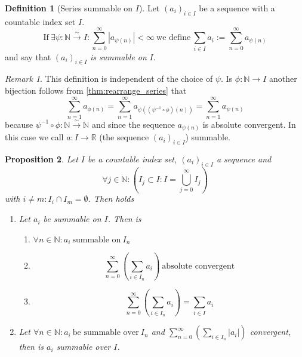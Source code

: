 \documentclass[english,titlepage]{uzhpub}
\theoremstyle{definition}
\newtheorem{definition}{Definition}[section]
\theoremstyle{plain}
\newtheorem{proposition}[definition]{Proposition}
\theoremstyle{remark}
\newtheorem*{remark}{Remark}
\theoremstyle{example}
\begin{document}
   \begin{definition}[Series summable on \(I\)]
      Let \((a_i)_{i \in I}\) be a sequence with a countable index set \(I\).
      \[\text{If}~\exists \psi: \mathbb{N} \xrightarrow{\sim} I: \sum_{n=0}^\infty |a_{\psi(n)}| < \infty~\text{we define}~\sum_{i \in I} a_i := \sum_{n=0}^\infty a_{\psi(n)}\]
      and say that \((a_i)_{i \in I}\) \textit{is summable on} \(I\).
   \end{definition}
   \begin{remark}
      This definition is independent of the choice of \(\psi\).
      Is \(\phi: \mathbb{N} \to I\) another bijection follows from \cref{thm:rearrange_series} that
      \[\sum_{n=1}^\infty a_{\phi(n)} = \sum_{n=1}^\infty a_{\psi((\psi^{-1} \circ \phi)(n))} = \sum_{n=1}^\infty a_{\psi(n)}\]
      because \(\psi^{-1} \circ \phi: \mathbb{N} \xrightarrow{\sim} \mathbb{N}\) and since the sequence \(a_{\psi(n)}\) is absolute convergent.
      In this case we call \(a: I \to \mathbb{R}\) (the sequence \((a_i)_{i \in I}\)) summable.
   \end{remark}

   \begin{proposition}\label{pro:sumable}
      Let \(I\) be a countable index set, \((a_i)_{i \in I}\) a sequence and
      \[\forall j \in \mathbb{N}: \left(I_j \subset I: I = \bigcup_{j=0}^\infty I_j\right)\]
      with \(i \neq m: I_i \cap I_m = \emptyset\).
      Then holds
      \begin{enumerate}[label=\roman*, align=Center]
         \item Let \(a_i\) be summable on \(I\). Then is
            \begin{enumerate}
               \item \(\forall n \in \mathbb{N}: a_i~\text{summable on}~I_n\)
               \item \[\sum_{n=0}^\infty\left(\sum_{i \in I_n} a_i\right)~\text{absolute convergent}\]
               \item \[\sum_{n=0}^\infty\left(\sum_{i \in I_n} a_i\right) = \sum_{i \in I} a_i\]
            \end{enumerate}
         \item Let \(\forall n \in \mathbb{N}: a_i~\text{be summable over}~I_n\) and \(\sum_{n=0}^\infty(\sum_{i \in I_n} |a_i|)\) convergent, then is \(a_i\) summable over \(I\).
      \end{enumerate}
   \end{proposition}
\end{document}
